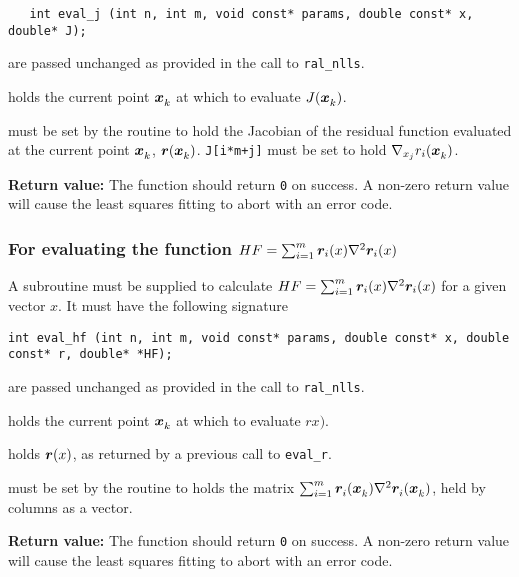 \documentclass{spec}
\begin{document}
\begin{verbatim}
   int eval_j (int n, int m, void const* params, double const* x, double* J);
\end{verbatim}

\begin{description}
    are passed unchanged as provided in the call to
      {\tt ral\_nlls}.

    holds the current point ${\bm x}_{k}^{}$ at which to evaluate
      $J({\bm x}_{k}^{})$.

    must be set by the routine to hold the Jacobian of the residual
      function evaluated at the current point ${\bm x}_{k}^{}$, ${\bm r}({\bm x}_{k}^{})$.
      \texttt{J[i*m+j]} must be set to hold $\nabla_{x_j} r_i({\bm x}_{k}^{})$.
\end{description}
\textbf{Return value:} The function should return \texttt{0} on success. A
non-zero return value will cause the least squares fitting to abort with an
error code.

\subsubsection{For evaluating the function $HF = \sum_{i=1}^m {\bm r}_i(x) \nabla^2 {\bm r}_i(x)$}
A subroutine must be supplied to calculate $HF = \sum_{i=1}^m {\bm r}_i(x) \nabla^2 {\bm r}_i(x)$ for a given vector $x$. It must have the following signature

\begin{verbatim}
int eval_hf (int n, int m, void const* params, double const* x, double const* r, double* *HF);
\end{verbatim}

\begin{description}
    are passed unchanged as provided in the call to
      {\tt ral\_nlls}.

    holds the current point ${\bm x}_{k}^{}$ at which to evaluate $rx)$.

    holds ${\bm r}(x)$, as returned by a previous call to \texttt{eval\_r}.

    must be set by the routine to holds the matrix
      $\sum_{i = 1}^m {\bm r}_{i}^{}({\bm x}_{k}^{})\nabla^2{\bm r}_{i}^{}({\bm x}_{k}^{})$, held
      by columns as a vector.
\end{description}
\textbf{Return value:} The function should return \texttt{0} on success. A
non-zero return value will cause the least squares fitting to abort with an
error code.
\end{document}
